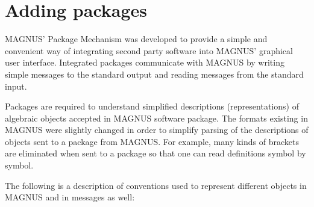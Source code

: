 \documentclass[12pt]{article}
\def\magnus{MAGNUS }
\def\nsmagnus{MAGNUS}
\begin{document}
\section{Adding packages}

\nsmagnus' Package Mechanism was developed to provide a simple and
convenient way of integrating second party software into \nsmagnus'
graphical user interface.
Integrated packages communicate with \magnus by writing simple
messages to  the standard output and reading messages from the
standard input.

Packages are required to  understand simplified
descriptions (representations) of algebraic  objects accepted in
\magnus software package. The formats existing in \magnus were
slightly changed in order to simplify parsing of the descriptions
of objects sent to a package from \nsmagnus.
For example, many kinds of brackets are eliminated when sent to a
package so that one can read definitions symbol by symbol.

The following is a description of conventions used to represent 
different objects in \magnus and in messages as well: 
\end{document}
